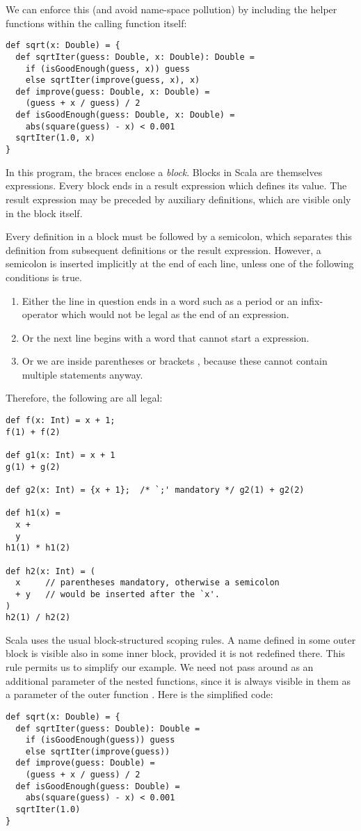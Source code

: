 We can enforce this (and avoid name-space pollution) by including
the helper functions within the calling function itself:
\begin{lstlisting}
def sqrt(x: Double) = {
  def sqrtIter(guess: Double, x: Double): Double =
    if (isGoodEnough(guess, x)) guess
    else sqrtIter(improve(guess, x), x)
  def improve(guess: Double, x: Double) =
    (guess + x / guess) / 2
  def isGoodEnough(guess: Double, x: Double) =
    abs(square(guess) - x) < 0.001
  sqrtIter(1.0, x)
}
\end{lstlisting}
In this program, the braces  enclose a {\em block}.
Blocks in Scala are themselves expressions.  Every block ends in a
result expression which defines its value.  The result expression may
be preceded by auxiliary definitions, which are visible only in the
block itself.

Every definition in a block must be followed by a semicolon, 
which separates this definition from subsequent definitions or the result
expression. However, a semicolon is inserted implicitly at the end of
each line, unless one of the following conditions is
true.
\begin{enumerate}
\item
Either the line in question ends in a word such as a period 
or an infix-operator which would not be legal as the end of an expression.
\item
Or the next line begins with a word that cannot start a expression.
\item
Or we are inside parentheses  or brackets \prog{}, 
because these cannot contain multiple statements anyway.
\end{enumerate}
Therefore, the following are all legal:
\begin{lstlisting}
def f(x: Int) = x + 1;
f(1) + f(2)

def g1(x: Int) = x + 1
g(1) + g(2)

def g2(x: Int) = {x + 1};  /* `;' mandatory */ g2(1) + g2(2)

def h1(x) = 
  x + 
  y
h1(1) * h1(2)

def h2(x: Int) = (
  x     // parentheses mandatory, otherwise a semicolon
  + y   // would be inserted after the `x'.
)
h2(1) / h2(2)
\end{lstlisting}
Scala uses the usual block-structured scoping rules. A name defined in
some outer block is visible also in some inner block, provided it is
not redefined there. This rule permits us to simplify our
 example. We need not pass  around as an additional parameter of
the nested functions, since it is always visible in them as a
parameter of the outer function . Here is the simplified code:
\begin{lstlisting}
def sqrt(x: Double) = {
  def sqrtIter(guess: Double): Double =
    if (isGoodEnough(guess)) guess
    else sqrtIter(improve(guess))
  def improve(guess: Double) =
    (guess + x / guess) / 2
  def isGoodEnough(guess: Double) =
    abs(square(guess) - x) < 0.001
  sqrtIter(1.0)
}
\end{lstlisting}

